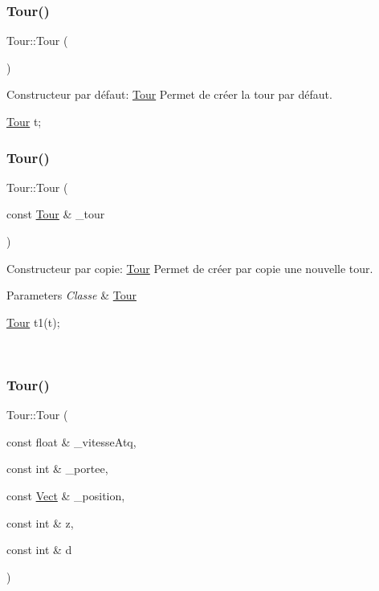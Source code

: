 \subsubsection{\texorpdfstring{Tour()}{Tour()}\hspace{0.1cm}{\footnotesize\ttfamily [1/3]}}
{\footnotesize\ttfamily Tour\+::\+Tour (\begin{DoxyParamCaption}{ }\end{DoxyParamCaption})}



Constructeur par défaut\+: \hyperlink{classTour}{Tour} Permet de créer la tour par défaut. 


\begin{DoxyCode}
\hyperlink{classTour}{Tour} t;
\end{DoxyCode}
 \mbox{\label{classTour_a3e25a64c74446192ac71283e08db4e49}} 
\subsubsection{\texorpdfstring{Tour()}{Tour()}\hspace{0.1cm}{\footnotesize\ttfamily [2/3]}}
{\footnotesize\ttfamily Tour\+::\+Tour (\begin{DoxyParamCaption}\item[{const \hyperlink{classTour}{Tour} \&}]{\+\_\+tour }\end{DoxyParamCaption})}



Constructeur par copie\+: \hyperlink{classTour}{Tour} Permet de créer par copie une nouvelle tour. 


\begin{DoxyParams}{Parameters}
{\em Classe} & \hyperlink{classTour}{Tour} 
\begin{DoxyCode}
\hyperlink{classTour}{Tour} t1(t);
\end{DoxyCode}
 \\
\hline
\end{DoxyParams}
\mbox{\label{classTour_abb21d80605aacb220f1ab7ac92119ce4}} 
\subsubsection{\texorpdfstring{Tour()}{Tour()}\hspace{0.1cm}{\footnotesize\ttfamily [3/3]}}
{\footnotesize\ttfamily Tour\+::\+Tour (\begin{DoxyParamCaption}\item[{const float \&}]{\+\_\+vitesse\+Atq,  }\item[{const int \&}]{\+\_\+portee,  }\item[{const \hyperlink{classVect}{Vect} \&}]{\+\_\+position,  }\item[{const int \&}]{z,  }\item[{const int \&}]{d }\end{DoxyParamCaption})}



